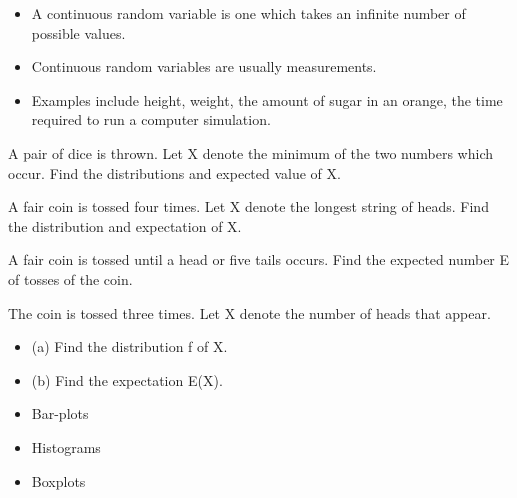 \documentclass[12pt]{report}
\begin{document}
		
		{\LARGE
			\begin{itemize} \item
				A continuous random variable is one which takes an infinite number of possible values. \item Continuous random variables are usually measurements. \item Examples include height, weight, the amount of sugar in an orange, the time required to run a computer simulation. \end{itemize}
			
		}
		
		
		
		A pair of dice is thrown. Let X denote the minimum of the two numbers which occur.
		Find the distributions and expected value of X.
		
		
		
		A fair coin is tossed four times.
		Let X denote the longest string of heads.
		Find the distribution and expectation of X.
		
		
		A fair coin is tossed until a head or five tails occurs.
		Find the expected number E of tosses of the coin.
		
		
		
		The coin is tossed three times. Let X denote the number of
		heads that appear.
		\begin{itemize}
			\item (a) Find the distribution f of X.
			\item (b) Find the expectation E(X).
		\end{itemize}
		
		
		
		\begin{itemize}
			\item Bar-plots
			\item Histograms
			\item Boxplots
			
		\end{itemize}
		
\end{document}
